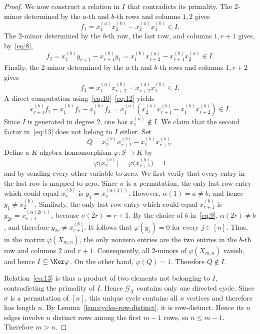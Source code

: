 \documentclass[12pt]{amsart}
\numberwithin{equation}{section}
\begin{document}
\begin{proof}
We now construct a relation in $I$ that contradicts its primality.
The $2$-minor determined by the $a$-th and $b$-th rows and columns
$1,2$ gives
\begin{equation}\label{eq:10}
f_1=
x_1^{(a)}x_2^{(b)}
-
x_2^{(a)}x_1^{(b)}
\in I.
\end{equation}
The $2$-minor determined by the $b$-th row, the last row, and columns
$1,r+1$ gives, by~\eqref{eq:8},
\begin{equation}\label{eq:11}
f_2
=
x_1^{(b)}y_{r+1}
-
x_{r+1}^{(b)}y_1
=
x_1^{(b)}x_{r+2}^{(a)}
-
x_{r+1}^{(b)}x_2^{(a)}
\in I.
\end{equation}
Finally, the $2$-minor determined by the $a$-th and $b$-th rows and
columns $1,r+2$ gives
\begin{equation}\label{eq:12}
f_3=
x_1^{(a)}x_{r+2}^{(b)}
-
x_{r+2}^{(a)}x_1^{(b)}
\in I.
\end{equation}
A direct computation using~\eqref{eq:10}--\eqref{eq:12} yields
\begin{equation}\label{eq:13}
x_{r+1}^{(b)}f_1
-
x_1^{(b)}f_2
-
x_1^{(b)}f_3
=
x_1^{(a)}
\left(
x_2^{(b)}x_{r+1}^{(b)}
-
x_1^{(b)}x_{r+2}^{(b)}
\right)
\in I.
\end{equation}
Since $I$ is generated in degree $2$, one has $x_1^{(a)}\notin I$.
We claim that the second factor in~\eqref{eq:13} does not belong to
$I$ either. Set
\[
Q=
x_2^{(b)}x_{r+1}^{(b)}
-
x_1^{(b)}x_{r+2}^{(b)}.
\]
Define a $K$-algebra homomorphism $\varphi:S\longrightarrow K$ by
\[
\varphi\bigl(x_2^{(b)}\bigr)
=
\varphi\bigl(x_{r+1}^{(b)}\bigr)=1
\]
and by sending every other variable to zero.
We first verify that every entry in the last row is mapped to zero.
Since $\sigma$ is a permutation, the only last-row entry which could
equal $x_2^{(b)}$ is $y_1=x_2^{(\alpha(1))}$.
However, $\alpha(1)=a\neq b$, and hence $y_1\neq x_2^{(b)}$.
Similarly, the only last-row entry which could equal
$x_{r+1}^{(b)}$ is $y_{2r}=x_{r+1}^{(\alpha(2r))}$,
because $\sigma(2r)=r+1$.
By the choice of $b$ in~\eqref{eq:9}, $\alpha(2r)\neq b$,
and therefore $y_{2r}\neq x_{r+1}^{(b)}$.
It follows that $\varphi(y_j)=0$ for every $j\in[n]$.
Thus, in the matrix $\varphi(X_{m,n})$, the only nonzero entries are
the two entries in the $b$-th row and columns $2$ and $r+1$.
Consequently, all $2$-minors of $\varphi(X_{m,n})$ vanish,
and hence $I\subseteq\Ker\varphi$.
On the other hand, $\varphi(Q)=1$. Therefore $Q\notin I$.

Relation~\eqref{eq:13} is thus a product of two elements not belonging
to $I$, contradicting the primality of $I$.
Hence $\mathcal G_X$ contains only one directed cycle.
Since $\sigma$ is a permutation of $[n]$, this unique cycle contains
all $n$ vertices and therefore has length $n$.
By Lemma~\ref{lem:cycles-row-distinct}, it is row-distinct.
Hence its $n$ edges involve $n$ distinct rows among the first $m-1$
rows, so $n\leq m-1$. Therefore $m>n$.
\end{proof}
\end{document}
